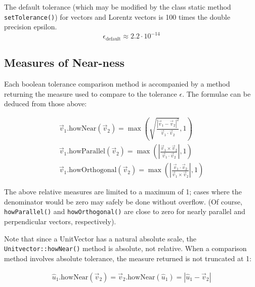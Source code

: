 \noindent

The default tolerance (which may be modified by the class static method
{\tt setTolerance()}) for vectors and Lorentz vectors
is 100 times the double precision epsilon.
\begin{equation}
  \epsilon_{\mbox{default}} \approx 2.2 \cdot 10^{-14}
\label{eq:epsildef}
\end{equation}

\subsection {Measures of Near-ness}

Each boolean tolerance comparison method is accompanied by a method returning
the measure used to compare to the tolerance $\epsilon$.
The formulae can be deduced from those above:

\begin{eqnarray}
\vec{v}_{1} \mbox{.howNear} (\vec{v}_{2}) =
  \max \left( \sqrt{ \frac {\left| \vec{v}_{1} - \vec{v}_{2} \right| ^ 2}
  {\vec{v}_{1} \cdot \vec{v}_{2}} } , 1 \right)
  \label{eq:howNear} \\
\vec{v}_{1} \mbox{.howParallel} (\vec{v}_{2}) =
  \max \left( \left| \frac{\vec{v}_{1} \times \vec{v}_{2}}
  {\vec{v}_{1} \cdot  \vec{v}_{2}}  \right| , 1 \right)
  \label{eq:howPar} \\
\vec{v}_{1} \mbox{.howOrthogonal} (\vec{v}_{2}) =
  \max \left( \left| \frac{\vec{v}_{1} \cdot \vec{v}_{2}}
		    {\vec{v}_{1} \times  \vec{v}_{2}}  \right| , 1 \right)
  \label{eq:howOrtho}
\end{eqnarray}

\noindent
The above relative measures are limited to a maximum of 1; cases where
the denominator would be zero may safely be done without overflow.
(Of course, {\tt howParallel()} and {\tt howOrthogonal()} are close to
zero for nearly parallel and perpendicular vectors, respectively).

Note that since a UnitVector has a natural absolute scale, the
{\tt Unitvector::howNear()} method is absolute, not relative.
When a comparison method involves absolute tolerance, the measure returned
is not truncated at 1:

\begin{eqnarray}
\hat{u}_{1} \mbox{.howNear} (\vec{v}_{2}) =
  \vec{v}_{2} \mbox{.howNear} (\hat{u}_{1}) =
  \left| \hat{u}_{1} - \vec{v}_{2} \right|
  \label{eq:howNear:2}
\end{eqnarray}

